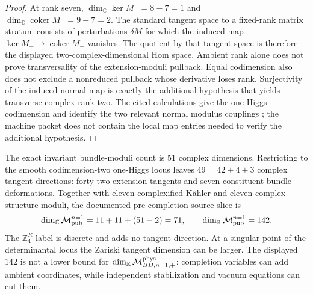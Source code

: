 \documentclass[11pt]{article}
\theoremstyle{remark}
\theoremstyle{plain}
\newcommand{\ZfourR}{\mathbb Z_4^R}
\begin{document}
\begin{proof}
At rank seven, \(\dim_{\mathbb C}\ker M_-=8-7=1\) and
\(\dim_{\mathbb C}\operatorname{coker}M_-=9-7=2\). The standard tangent space to a fixed-rank
matrix stratum consists of perturbations \(\delta M\) for which the induced map
\(\ker M_-\to\operatorname{coker}M_-\) vanishes. The quotient by that tangent space is therefore
the displayed two-complex-dimensional Hom space. Ambient rank alone does not prove transversality
of the extension-moduli pullback. Equal codimension also does not exclude a nonreduced pullback
whose derivative loses rank. Surjectivity of the induced normal map is exactly the additional
hypothesis that yields transverse complex rank two. The cited calculations give the one-Higgs
codimension and identify the two relevant normal modulus couplings
\cite{BouchardDonagi2005,BouchardCveticDonagi2006}; the machine packet does not contain the local
map entries needed to verify the additional hypothesis.
\end{proof}

The exact invariant bundle-moduli count is \(51\) complex dimensions. Restricting to the smooth
codimension-two one-Higgs locus leaves \(49=42+4+3\) complex tangent directions: forty-two
extension tangents and seven constituent-bundle deformations. Together with eleven complexified
K\"ahler and eleven complex-structure moduli, the documented pre-completion source slice is
\[
\dim_{\mathbb C}\mathcal M_{\rm pub}^{n=1}
=11+11+(51-2)=71,
\qquad
\dim_{\mathbb R}\mathcal M_{\rm pub}^{n=1}=142.
\]
The \(\ZfourR\) label is discrete and adds no tangent direction. At a singular point of the
determinantal locus the Zariski tangent dimension can be larger. The displayed \(142\) is not a
lower bound for \(\dim_{\mathbb R}\mathcal M^{\rm phys}_{BD,n=1,+}\): completion variables can
add ambient coordinates, while independent stabilization and vacuum equations can cut them.
\end{document}
